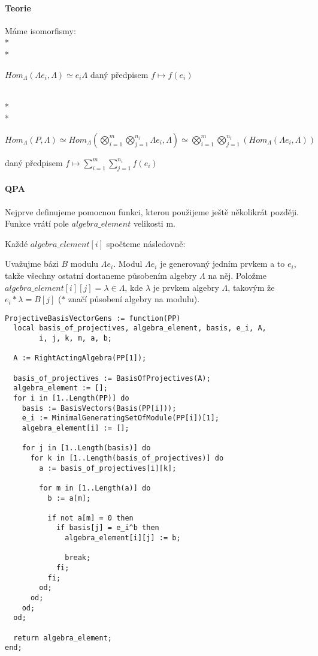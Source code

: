 \documentclass[7pt]{article}
\begin{document}
       \paragraph{Teorie}
         Máme isomorfismy: \\*\\*
         \centerline{
           $Hom_\Lambda (\Lambda e_i, \Lambda)\simeq e_i\Lambda$ daný předpisem $f \mapsto f(e_i)$
         }
         \\*\\*
         \centerline{
           $Hom_\Lambda (P,\Lambda) \simeq 
             Hom_\Lambda (\bigotimes_{i=1}^m\bigotimes_{j=1}^{n_i}\Lambda e_i,\Lambda) \simeq
             \bigotimes_{i=1}^m\bigotimes_{j=1}^{n_i}(Hom_\Lambda (\Lambda e_i,\Lambda))$
         }
         \centerline{
           daný předpisem $f\mapsto\sum_{i=1}^m\sum_{j=1}^{n_i}f(e_i)$
         }
       
        \paragraph{QPA}
          Nejprve definujeme pomocnou funkci, kterou použijeme ještě několikrát později. Funkce vrátí
          pole $algebra\_element$ velikosti m.
          
          Každé $algebra\_element[i]$ spočteme následovně:
          
          Uvažujme bázi $B$ modulu $\Lambda e_i$. Modul $\Lambda e_i$ je 
          generovaný jedním prvkem a to $e_i$, takže všechny ostatní dostaneme 
          působením algebry $\Lambda$ na něj. Položme $algebra\_element[i][j]=\lambda\in\Lambda$, 
          kde $\lambda$ 
          je prvkem algebry $\Lambda$, takovým že $e_i*\lambda=B[j]$ 
          ($*$ značí působení algebry na modulu).
       
          \begin{verbatim}        
ProjectiveBasisVectorGens := function(PP)
  local basis_of_projectives, algebra_element, basis, e_i, A,
        i, j, k, m, a, b;

  A := RightActingAlgebra(PP[1]);

  basis_of_projectives := BasisOfProjectives(A);
  algebra_element := [];
  for i in [1..Length(PP)] do
    basis := BasisVectors(Basis(PP[i]));
    e_i := MinimalGeneratingSetOfModule(PP[i])[1];
    algebra_element[i] := [];

    for j in [1..Length(basis)] do
      for k in [1..Length(basis_of_projectives)] do
        a := basis_of_projectives[i][k];

        for m in [1..Length(a)] do
          b := a[m];

          if not a[m] = 0 then
            if basis[j] = e_i^b then
              algebra_element[i][j] := b;

              break;
            fi;
          fi;
        od;
      od;
    od;
  od;

  return algebra_element;
end;

         \end{verbatim}
\end{document}
